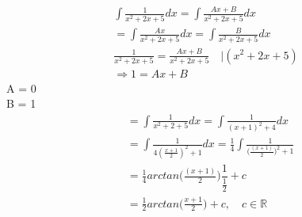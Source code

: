 \begin{example}
\begin{gather*}
\int \frac{1}{x^2 + 2x + 5}dx = \int \frac{Ax+B}{x^2 + 2x + 5 }dx \\
= \int \frac{Ax}{x^2 + 2x + 5 }dx = \int \frac{B}{x^2 + 2x + 5}dx \\
\frac{1}{x^2 + 2x + 5} = \frac{Ax+B}{x^2 + 2x + 5} \quad | (x^2 + 2x +5)\\
\Rightarrow 1 = Ax+B
\end{gather*}
A = 0\\
B = 1
\begin{align*}
&=\int \frac{1}{x^2 + 2 + 5}dx =
\int \frac{1}{(x+1)^2+4}dx \\
&=\int \frac{1}{4(\frac{x+1}{2})^2+1}dx =
\frac{1}{4} \int \frac{1}{ \big( \frac{(x+1)}{2} \big)^2 +1}\\
&=  \frac{1}{4} arctan \bigg( \frac{(x+1)}{2} \bigg) \dfrac{1}{\frac{1}{2}} + c\\
&= \frac{1}{2} arctan \bigg( \frac{x+1}{2} \bigg) + c , \quad c \in \mathbb{R}
\end{align*}

\end{example}
